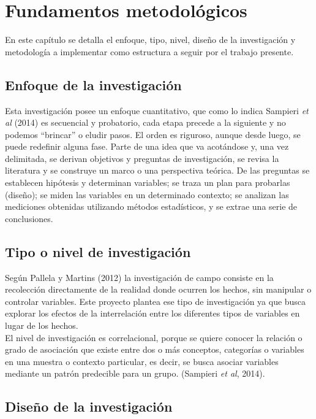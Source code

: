 \chapter{Fundamentos metodológicos}

	En este capítulo se detalla el enfoque, tipo, nivel, diseño de la investigación y metodología a implementar como estructura a seguir por el trabajo presente.

\section{Enfoque de la investigación}

	Esta investigación posee un enfoque cuantitativo, que como lo indica Sampieri \textit{et al} (2014) es secuencial y
	probatorio, cada etapa precede a la siguiente y no podemos “brincar” o eludir pasos. El orden es riguroso,
	aunque desde luego, se puede redefinir alguna fase. Parte de una idea que va acotándose y, una vez delimitada,
	se derivan objetivos y preguntas de investigación, se revisa la literatura y se construye un marco o una perspectiva
	teórica. De las preguntas se establecen hipótesis y determinan variables; se traza un plan para probarlas (diseño);
	se miden las variables en un determinado contexto; se analizan las mediciones obtenidas utilizando métodos estadísticos,
	y se extrae una serie de conclusiones.\\


\section{Tipo o nivel de investigaci\'on}

Según Pallela y Martins (2012) la investigación de campo consiste en la recolección directamente de la realidad donde ocurren los hechos, sin manipular o controlar variables. Este proyecto plantea ese tipo de investigación ya que busca explorar los efectos de la interrelación entre los diferentes tipos de variables en lugar de los hechos.\\

El nivel de investigación es correlacional, porque se quiere conocer la relación o grado de asociación que existe entre dos o más conceptos, categorías o variables en una muestra o contexto particular, es decir, se busca asociar variables mediante un patrón predecible para un grupo. (Sampieri \textit{et al}, 2014).


\section{Dise\~no de la investigaci\'on}

